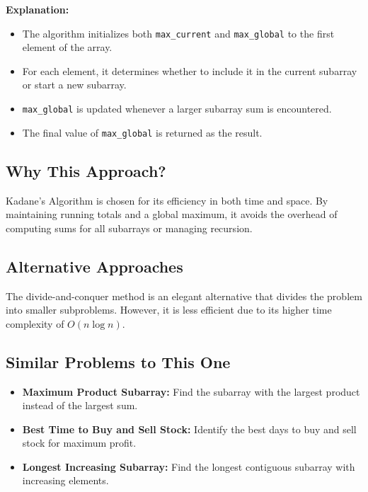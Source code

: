 \textbf{Explanation:}
\begin{itemize}
    \item The algorithm initializes both \texttt{max\_current} and \texttt{max\_global} to the first element of the array.
    \item For each element, it determines whether to include it in the current subarray or start a new subarray.
    \item \texttt{max\_global} is updated whenever a larger subarray sum is encountered.
    \item The final value of \texttt{max\_global} is returned as the result.
\end{itemize}

\subsection*{Why This Approach?}
Kadane's Algorithm is chosen for its efficiency in both time and space. By maintaining running totals and a global maximum, it avoids the overhead of computing sums for all subarrays or managing recursion.

\subsection*{Alternative Approaches}
The divide-and-conquer method is an elegant alternative that divides the problem into smaller subproblems. However, it is less efficient due to its higher time complexity of \(O(n \log n)\).

\subsection*{Similar Problems to This One}
\begin{itemize}
    \item \textbf{Maximum Product Subarray:} Find the subarray with the largest product instead of the largest sum.
    \item \textbf{Best Time to Buy and Sell Stock:} Identify the best days to buy and sell stock for maximum profit.
    \item \textbf{Longest Increasing Subarray:} Find the longest contiguous subarray with increasing elements.
\end{itemize}

